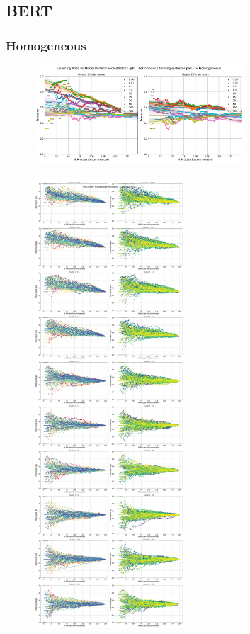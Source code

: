 \documentclass[a4paper,fontsize=8.0pt]{scrartcl}
\begin{document}
\subsection{BERT}
\subsubsection{Homogeneous}
\begin{figure}[H]
    \includegraphics[width=0.7\textwidth]{Graphs/BERT/lr_vs_model_performance_single_mixed_Homogeneous.pdf}
\end{figure}
\newpage
\begin{figure}[H]
    \includegraphics[width=0.5\textwidth]{Graphs/BERT/lr_vs_model_performance_precision_all_cps_mixed_data_sep_Homogeneous.pdf}
\end{figure}
\newpage
\end{document}
